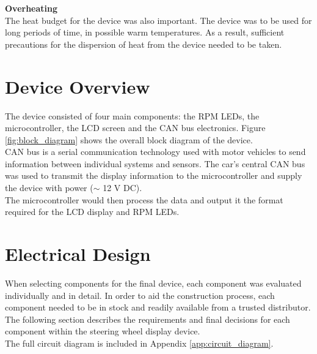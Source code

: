 \documentclass[a4paper,12pt]{article}
\begin{document}
\textbf{Overheating} \\

The heat budget for the device was also important. The device was to be used for long periods of time, in possible warm temperatures. As a result, sufficient precautions for the dispersion of heat from the device needed to be taken.


\newpage
\section{Device Overview}
\label{sec:device_overview}

The device consisted of four main components: the RPM LEDs, the microcontroller, the LCD screen and the CAN bus electronics. Figure \ref{fig:block_diagram} shows the overall block diagram of the device. \\



CAN bus is a serial communication technology used with motor vehicles to send information between individual systems and sensors. The car's central CAN bus was used to transmit the display information to the microcontroller and supply the device with power ($\sim$ 12 V DC). \\

The microcontroller would then process the data and output it the format required for the LCD display and RPM LEDs. \\


\newpage
\section{Electrical Design}
\label{sec:electrical_design}

When selecting components for the final device, each component was evaluated individually and in detail. In order to aid the construction process, each component needed to be in stock and readily available from a trusted distributor. The following section describes the requirements and final decisions for each component within the steering wheel display device. \\

The full circuit diagram is included in Appendix \ref{app:circuit_diagram}.
\end{document}
